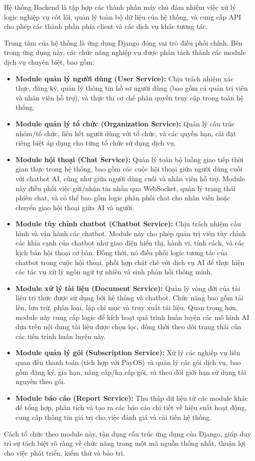 Hệ thống Backend là tập hợp các thành phần máy chủ đảm nhiệm việc xử lý logic nghiệp vụ cốt lõi, quản lý toàn bộ dữ liệu của hệ thống, và cung cấp API cho phép các thành phần phía client và các dịch vụ khác tương tác.

Trung tâm của hệ thống là ứng dụng Django đóng vai trò điều phối chính. Bên trong ứng dụng này, các chức năng nghiệp vụ được phân tách thành các module dịch vụ chuyên biệt, bao gồm:
\begin{itemize}
    \item \textbf{Module quản lý người dùng (User Service):} Chịu trách nhiệm xác thực, đăng ký, quản lý thông tin hồ sơ người dùng (bao gồm cả quản trị viên và nhân viên hỗ trợ), và thực thi cơ chế phân quyền truy cập trong toàn hệ thống.
    \item \textbf{Module quản lý tổ chức (Organization Service):} Quản lý cấu trúc nhóm/tổ chức, liên kết người dùng với tổ chức, và các quyền hạn, cài đặt riêng biệt áp dụng cho từng tổ chức sử dụng dịch vụ.
    \item \textbf{Module hội thoại (Chat Service):} Quản lý toàn bộ luồng giao tiếp thời gian thực trong hệ thống, bao gồm các cuộc hội thoại giữa người dùng cuối với chatbot AI, cũng như giữa người dùng cuối và nhân viên hỗ trợ. Module này điều phối việc gửi/nhận tin nhắn qua WebSocket, quản lý trạng thái phiên chat, và có thể bao gồm logic phân phối chat cho nhân viên hoặc chuyển giao hội thoại giữa AI và người.
    \item \textbf{Module tùy chỉnh chatbot (Chatbot Service):} Chịu trách nhiệm cấu hình và vận hành các chatbot. Module này cho phép quản trị viên tùy chỉnh các khía cạnh của chatbot như giao diện hiển thị, hành vi, tính cách, và các kịch bản hội thoại cơ bản. Đồng thời, nó điều phối logic tương tác của chatbot trong cuộc hội thoại, phối hợp chặt chẽ với dịch vụ AI để thực hiện các tác vụ xử lý ngôn ngữ tự nhiên và sinh phản hồi thông minh.
    \item \textbf{Module xử lý tài liệu (Document Service):} Quản lý vòng đời của tài liệu tri thức được sử dụng bởi hệ thống và chatbot. Chức năng bao gồm tải lên, lưu trữ, phân loại, lập chỉ mục và truy xuất tài liệu. Quan trọng hơn, module này cung cấp logic để kích hoạt quá trình huấn luyện các mô hình AI dựa trên nội dung tài liệu được chọn lọc, đồng thời theo dõi trạng thái của các tiến trình huấn luyện này.
    \item \textbf{Module quản lý gói (Subscription Service):} Xử lý các nghiệp vụ liên quan đến thanh toán (tích hợp với PayOS) và quản lý các gói dịch vụ, bao gồm đăng ký, gia hạn, nâng cấp/hạ cấp gói, và theo dõi giới hạn sử dụng tài nguyên theo gói.
    \item \textbf{Module báo cáo (Report Service):} Thu thập dữ liệu từ các module khác để tổng hợp, phân tích và tạo ra các báo cáo chi tiết về hiệu suất hoạt động, cung cấp thông tin giá trị cho việc đánh giá và cải tiến hệ thống.
\end{itemize}
Cách tổ chức theo module này, tận dụng cấu trúc ứng dụng của Django, giúp duy trì sự tách biệt rõ ràng về chức năng trong một mã nguồn thống nhất, thuận lợi cho việc phát triển, kiểm thử và bảo trì.


